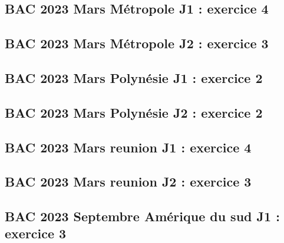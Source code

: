 \documentclass[lang=fr,edition=teacher,layout=sheet]{mxbook}
\begin{document}
\begingroup\endgroup
\par\bigskip
{}\subsection*{BAC 2023 Mars Métropole J1 : exercice 4}
\begingroup\endgroup
\par\bigskip
{}\subsection*{BAC 2023 Mars Métropole J2 : exercice 3}
\begingroup\endgroup
\par\bigskip
{}\subsection*{BAC 2023 Mars Polynésie J1 : exercice 2}
\begingroup\endgroup
\par\bigskip
{}\subsection*{BAC 2023 Mars Polynésie J2 : exercice 2}
\begingroup\endgroup
\par\bigskip
{}\subsection*{BAC 2023 Mars reunion J1 : exercice 4}
\begingroup\endgroup
\par\bigskip
{}\subsection*{BAC 2023 Mars reunion J2 : exercice 3}
\begingroup\endgroup
\par\bigskip
{}\subsection*{BAC 2023 Septembre Amérique du sud J1 : exercice 3}
\end{document}
